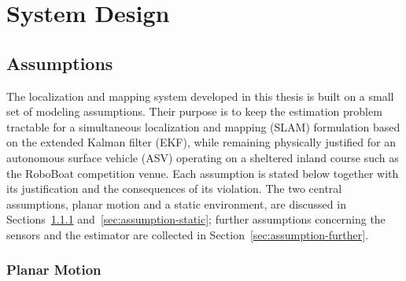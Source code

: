 \chapter{System Design}
\label{chap:system-design}

\section{Assumptions}
\label{sec:system-design-assumptions}

The localization and mapping system developed in this thesis is built on a
small set of modeling assumptions. Their purpose is to keep the estimation
problem tractable for a simultaneous localization and mapping (SLAM)
formulation based on the extended Kalman filter (EKF), while remaining
physically justified for an autonomous surface vehicle (ASV) operating on a
sheltered inland course such as the RoboBoat competition venue. Each
assumption is stated below together with its justification and the
consequences of its violation. The two central assumptions, planar motion
and a static environment, are discussed in
Sections~\ref{sec:assumption-planar} and~\ref{sec:assumption-static};
further assumptions concerning the sensors and the estimator are collected
in Section~\ref{sec:assumption-further}.

\subsection{Planar Motion}
\label{sec:assumption-planar}

